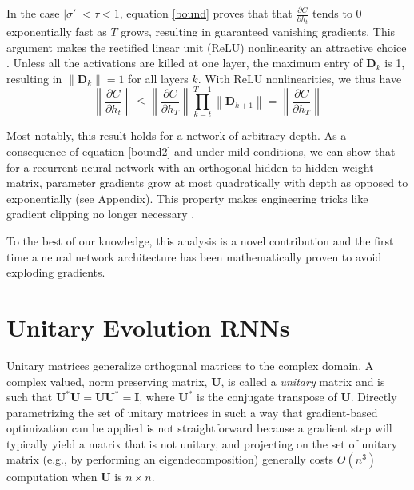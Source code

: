 \documentclass{article} %
\newcommand{\matr}[1]{\mathbf{#1}}
\newcommand\norm[1]{\left\lVert#1\right\rVert}
\begin{document}
In the case $|\sigma'| < \tau < 1$, equation \ref{bound} proves that 
that $\frac{\partial C}{\partial h_t}$ tends to 0 exponentially fast as $T$ grows, 
resulting in guaranteed vanishing gradients. 
This argument makes the rectified linear unit (ReLU) nonlinearity an attractive choice
\citep{Glorot2011, Nair2010}. Unless all the activations are killed at one layer, 
the maximum entry of $\matr{D}_k$ is 1, resulting in
$\norm{\matr{D}_k} = 1$ for all layers $k$. With ReLU nonlinearities, we thus have
\begin{equation}
  \norm{\frac{\partial C}{\partial h_t}} \leq \norm{ \frac{\partial C}{\partial h_T}} 
  \prod_{k=t}^{T-1} \norm{\matr{D}_{k+1}} = \norm{\frac{\partial C}{\partial h_T}}
\label{bound2}
\end{equation}

Most notably, this result holds for a network of arbitrary depth. 
As a consequence of equation \ref{bound2} and under mild conditions, we can show that
for a recurrent neural network with an orthogonal hidden to hidden weight matrix, 
parameter gradients grow at most quadratically with depth as opposed to exponentially
{\color{red}(see Appendix)}. This property makes engineering tricks like gradient clipping no longer
necessary \citep{Pascanu2013}.

To the best of our knowledge, this analysis is a novel contribution and the first time a 
neural network architecture has been mathematically proven to avoid exploding gradients. 


%
%
%
%
%

\section{Unitary Evolution RNNs}
\label{sec:uRNN}

Unitary matrices generalize orthogonal matrices to the complex domain.
A complex valued, norm preserving matrix,
$\matr{U}$, is called a \textit{unitary} matrix and is such that 
$\matr{U}^* \matr{U} = \matr{U} \matr{U}^* = \matr{I}$, where $\matr{U}^*$ is the conjugate transpose
of $\matr{U}$.  Directly parametrizing the set of unitary matrices in such a way that gradient-based
optimization can be applied is not straightforward because a gradient step will typically yield
a matrix that is not unitary, and projecting on the set of unitary matrix (e.g., by performing
an eigendecomposition) generally costs $O(n^3)$ computation when $\matr{U}$ is $n \times n$.
\end{document}
